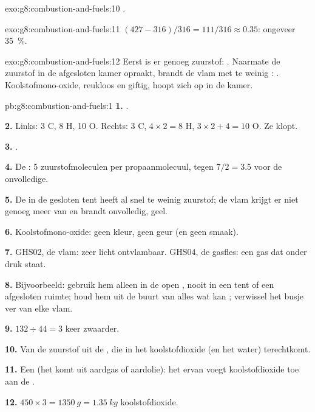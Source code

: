 \begin{solution}{exo:g8:combustion-and-fuels:10}
.
\end{solution}

\begin{solution}{exo:g8:combustion-and-fuels:11}
$(427 - 316)/316 = 111/316 \approx 0.35$: ongeveer \qty{35}{\percent}.
\end{solution}

\begin{solution}{exo:g8:combustion-and-fuels:12}
Eerst is er genoeg zuurstof: . Naarmate de
zuurstof in de afgesloten kamer opraakt, brandt de vlam met te weinig
: . Koolstofmono-oxide, reukloos en
giftig, hoopt zich op in de kamer.
\end{solution}

\begin{solution}{pb:g8:combustion-and-fuels:1}
\textbf{1.} .

\textbf{2.} Links: 3 C, 8 H, 10 O. Rechts: 3 C, $4 \times 2 = 8$ H,
$3 \times 2 + 4 = 10$ O. Ze klopt.

\textbf{3.} .

\textbf{4.} De : 5 zuurstofmoleculen per
propaanmolecuul, tegen $7/2 = 3.5$ voor de onvolledige.

\textbf{5.} De  in de gesloten tent heeft al snel te weinig
zuurstof; de vlam krijgt er niet genoeg meer van en brandt onvolledig,
geel.

\textbf{6.} Koolstofmono-oxide: geen kleur, geen geur (en geen smaak).

\textbf{7.} GHS02, de vlam: zeer licht ontvlambaar. GHS04, de gasfles:
een gas dat onder druk staat.

\textbf{8.} Bijvoorbeeld: gebruik hem alleen in de open , nooit in
een tent of een afgesloten ruimte; houd hem uit de buurt van alles wat
kan ; verwissel het busje ver van elke vlam.

\textbf{9.} $132 \div 44 = 3$ keer zwaarder.

\textbf{10.} Van de zuurstof uit de , die in het koolstofdioxide
(en het water) terechtkomt.

\textbf{11.} Een  (het komt uit aardgas of aardolie):
het  ervan voegt koolstofdioxide toe aan de .

\textbf{12.} $450 \times 3 = \qty{1350}{g} = \qty{1.35}{kg}$
koolstofdioxide.
\end{solution}
